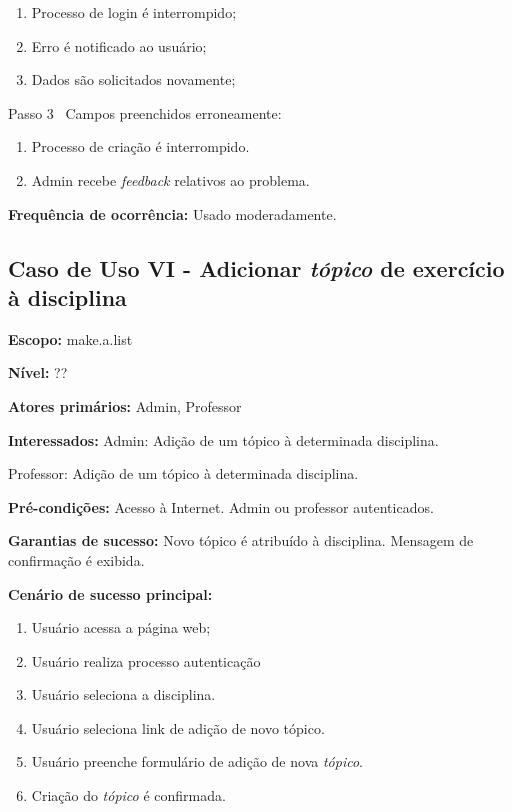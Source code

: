 \documentclass[12pt,oneside,a4paper,article]{abntex2}
\begin{document}
		\begin{enumerate}[label=\alph*.]	
			\item Processo de login é interrompido;
			\item Erro é notificado ao usuário;
			\item Dados são solicitados novamente;
		\end{enumerate}
		
		Passo 3 \textrightarrow \ Campos preenchidos erroneamente:
		
		\begin{enumerate}[label=\alph*.]	
			\item Processo de criação é interrompido.
			\item Admin recebe \textit{feedback} relativos ao problema.	
		\end{enumerate}
		
		
		\textbf{Frequência de ocorrência:} Usado moderadamente.
	
		\subsection{Caso de Uso VI - Adicionar \textit{tópico} de exercício à disciplina}
		
		\textbf{Escopo:} make.a.list 
		
		\textbf{Nível:} ??
		
		\textbf{Atores primários:} Admin, Professor
		
		\textbf{Interessados:} Admin: Adição de um tópico à determinada disciplina.
		
		Professor: Adição de um tópico à determinada disciplina.
		
		\textbf{Pré-condições:} Acesso à Internet. Admin ou professor autenticados.
		
		\textbf{Garantias de sucesso:} Novo tópico é atribuído à disciplina. Mensagem de confirmação é exibida.
		
		\textbf{Cenário de sucesso principal:} 
		
		\begin{enumerate}
			\item Usuário acessa a página web;
			
			\item Usuário realiza processo autenticação
			
			\item Usuário seleciona a disciplina.
			
			\item Usuário seleciona link de adição de novo tópico.
			
			\item Usuário preenche formulário de adição de nova \textit{tópico}.
			
			\item Criação do \textit{tópico} é confirmada.
			
		\end{enumerate}
		
\end{document}

